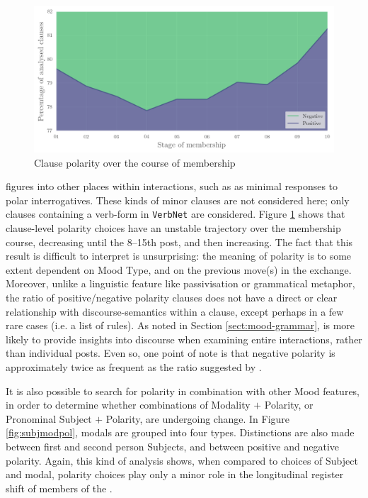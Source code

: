 \begin{figure}[htb]
    \centering
    \includegraphics[width=.7\textwidth]{../images/polarity-area.png}
    \caption{Clause polarity over the course of membership}
    \label{fig:polarity}
    \end{figure}

 figures into other places within interactions, such as as minimal responses to polar interrogatives. These kinds of minor clauses are not considered here; only clauses containing a verb\hyp{}form in \texttt{VerbNet} are considered. Figure \ref{fig:polarity} shows that clause\hyp{}level polarity choices have an unstable trajectory over the membership course, decreasing until the 8--15th post, and then increasing. The fact that this result is difficult to interpret is unsurprising: the meaning of polarity is to some extent dependent on Mood Type, and on the previous move(s) in the exchange. Moreover, unlike a linguistic feature like passivisation or grammatical metaphor, the ratio of positive\slash negative polarity clauses does not have a direct or clear relationship with \glspl{discourse-semantic} within a clause, except perhaps in a few rare cases (i.e. a list of rules). As noted in Section \ref{sect:mood-grammar},  is more likely to provide insights into discourse when examining entire interactions, rather than individual \glspl{post}. Even so, one point of note is that negative polarity is approximately twice as frequent as the ratio suggested by \textcite[ten per cent of all clauses---see][]{halliday_introduction_2004}.

It is also possible to search for polarity in combination with other Mood features, in order to determine whether combinations of Modality $+$ Polarity, or Pronominal Subject $+$ Polarity, are undergoing change. In Figure \ref{fig:subjmodpol}, modals are grouped into four types. Distinctions are also made between first and second person Subjects, and between positive and negative polarity. Again, this kind of analysis shows, when compared to choices of Subject and modal, polarity choices play only a minor role in the longitudinal register shift of \glspl{member} of the .

